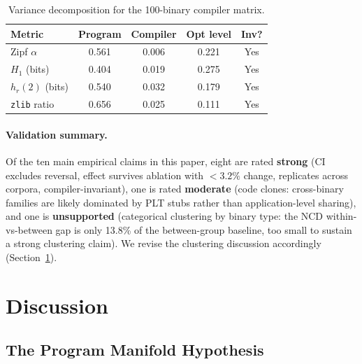 \documentclass[10pt,twocolumn]{article}
\newcommand{\zlib}{\texttt{zlib}}
\begin{document}
\begin{table}[h]
\centering
\caption{Variance decomposition for the 100-binary compiler matrix.}
\label{tab:compiler_var}
\small
\begin{tabular}{@{}lcccc@{}}
\toprule
\textbf{Metric} & \textbf{Program} & \textbf{Compiler} & \textbf{Opt level} & \textbf{Inv?} \\
\midrule
Zipf $\alpha$  & 0.561 & 0.006 & 0.221 & Yes \\
$H_1$ (bits)   & 0.404 & 0.019 & 0.275 & Yes \\
$h_r(2)$ (bits)& 0.540 & 0.032 & 0.179 & Yes \\
\zlib{} ratio  & 0.656 & 0.025 & 0.111 & Yes \\
\bottomrule
\end{tabular}
\end{table}

\paragraph{Validation summary.}
Of the ten main empirical claims in this paper, eight are rated
\textbf{strong} (CI excludes reversal, effect survives ablation with
$<3.2\%$ change, replicates across corpora, compiler-invariant), one is
rated \textbf{moderate} (code clones: cross-binary families are likely
dominated by PLT stubs rather than application-level sharing), and one is
\textbf{unsupported} (categorical clustering by binary type: the NCD
within-vs-between gap is only 13.8\% of the between-group baseline, too
small to sustain a strong clustering claim).  We revise the clustering
discussion accordingly (Section~\ref{sec:discussion}).

\section{Discussion}
\label{sec:discussion}

\subsection{The Program Manifold Hypothesis}
\end{document}
